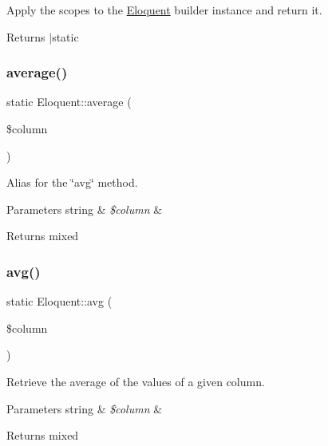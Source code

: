 Apply the scopes to the \mbox{\hyperlink{class_eloquent}{Eloquent}} builder instance and return it.

\begin{DoxyReturn}{Returns}
$\vert$static 
\end{DoxyReturn}
\mbox{\label{class_eloquent_a7ad1944b3c3cc2e9f11b9d028ffa5501}} 
\subsubsection{\texorpdfstring{average()}{average()}}
{\footnotesize\ttfamily static Eloquent\+::average (\begin{DoxyParamCaption}\item[{}]{\$column }\end{DoxyParamCaption})\hspace{0.3cm}{\ttfamily [static]}}

Alias for the \char`\"{}avg\char`\"{} method.


\begin{DoxyParams}[1]{Parameters}
string & {\em \$column} & \\
\hline
\end{DoxyParams}
\begin{DoxyReturn}{Returns}
mixed 
\end{DoxyReturn}
\mbox{\label{class_eloquent_a0b3828a100dd3fdcb15a5df6bc4c0f16}} 
\subsubsection{\texorpdfstring{avg()}{avg()}}
{\footnotesize\ttfamily static Eloquent\+::avg (\begin{DoxyParamCaption}\item[{}]{\$column }\end{DoxyParamCaption})\hspace{0.3cm}{\ttfamily [static]}}

Retrieve the average of the values of a given column.


\begin{DoxyParams}[1]{Parameters}
string & {\em \$column} & \\
\hline
\end{DoxyParams}
\begin{DoxyReturn}{Returns}
mixed 
\end{DoxyReturn}
\mbox{\label{class_eloquent_a48c14c8ed872ba28234c2697d75235d7}} 
